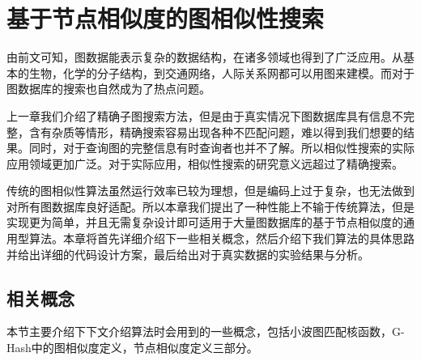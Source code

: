 \documentclass{XDBAthesis}
\begin{document}
\else
\fi
\chapter{基于节点相似度的图相似性搜索}
\label{chap:gHash}
由前文可知，图数据能表示复杂的数据结构，在诸多领域也得到了广泛应用。从基本的生物，化学的分子结构，到交通网络，人际关系网都可以用图来建模。而对于图数据库的搜索也自然成为了热点问题。

上一章我们介绍了精确子图搜索方法，但是由于真实情况下图数据库具有信息不完整，含有杂质等情形，精确搜索容易出现各种不匹配问题，难以得到我们想要的结果。同时，对于查询图的完整信息有时查询者也并不了解。所以相似性搜索的实际应用领域更加广泛。对于实际应用，相似性搜索的研究意义远超过了精确搜索。

传统的图相似性算法虽然运行效率已较为理想，但是编码上过于复杂，也无法做到对所有图数据库良好适配。所以本章我们提出了一种性能上不输于传统算法，但是实现更为简单，并且无需复杂设计即可适用于大量图数据库的基于节点相似度的通用型算法。本章将首先详细介绍下一些相关概念，然后介绍下我们算法的具体思路并给出详细的代码设计方案，最后给出对于真实数据的实验结果与分析。
\section{相关概念}
本节主要介绍下下文介绍算法时会用到的一些概念，包括小波图匹配核函数，G-Hash中的图相似度定义，节点相似度定义三部分。
\end{document}
